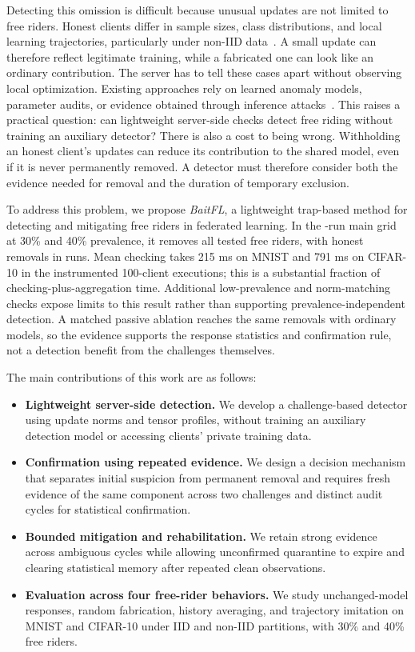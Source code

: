 \documentclass[journal]{IEEEtran}
\begin{document}
Detecting this omission is difficult because unusual updates are not limited
to free riders. Honest clients differ in sample sizes, class distributions,
and local learning trajectories, particularly under non-IID
data~\cite{kairouz2021advances}. A small update can therefore reflect
legitimate training, while a fabricated one can look like an ordinary
contribution. The server has to tell these cases apart without observing
local optimization. Existing approaches rely on learned anomaly models,
parameter audits, or evidence obtained through inference
attacks~\cite{lin2019freeriders,wang2024pass,recasens2026frida}. This raises a
practical question: can lightweight server-side checks detect free riding
without training an auxiliary detector? There is also a cost to being wrong.
Withholding an honest client's updates can reduce its contribution to the shared
model, even if it is never permanently removed. A detector must therefore
consider both the evidence needed for removal and the duration of temporary
exclusion.

To address this problem, we propose \emph{BaitFL}, a lightweight trap-based
method for detecting and mitigating free riders in federated learning.
In the \ReviewRunCount{}-run main grid at 30\% and 40\% prevalence,
it removes all tested free riders,
with \MultiFP{} honest removals in \ReviewAffectedRuns{} runs. Mean checking takes 215 ms on MNIST and 791 ms on CIFAR-10 in the
instrumented 100-client executions; this is a substantial fraction of
checking-plus-aggregation time.
Additional low-prevalence and norm-matching checks expose limits to this
result rather than supporting prevalence-independent detection.
A matched passive ablation reaches the same removals with ordinary models,
so the evidence supports the response statistics and confirmation rule,
not a detection benefit from the challenges themselves.

\noindent The main contributions of this work are as follows:
\begin{itemize} %
\item \textbf{Lightweight server-side detection.} We develop a challenge-based
detector using update norms and tensor profiles, without training an auxiliary
detection model or accessing clients' private training data.
\item \textbf{Confirmation using repeated evidence.} We design a decision
mechanism that separates initial suspicion from permanent removal and requires
fresh evidence of the same component across two challenges and distinct audit
cycles for statistical confirmation.
\item \textbf{Bounded mitigation and rehabilitation.} We retain strong evidence
across ambiguous cycles while allowing unconfirmed quarantine to expire and
clearing statistical memory after repeated clean observations.
\item \textbf{Evaluation across four free-rider behaviors.} We study unchanged-model
responses, random fabrication, history averaging, and trajectory imitation on
MNIST and CIFAR-10 under IID and non-IID partitions, with 30\% and 40\% free riders.
\end{itemize}
\end{document}

